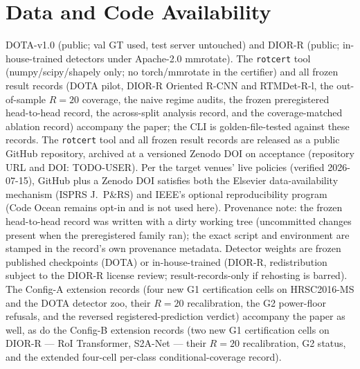 \documentclass[11pt]{article}
\begin{document}
\section*{Data and Code Availability}
DOTA-v1.0 (public; val GT used, test server untouched) and DIOR-R (public; in-house-trained detectors under
Apache-2.0 mmrotate). The \texttt{rotcert} tool (numpy/scipy/shapely only; no torch/mmrotate in the certifier)
and all frozen result records (DOTA pilot, DIOR-R Oriented R-CNN and RTMDet-R-l, the out-of-sample $R{=}20$
coverage, the naive regime audits, the frozen preregistered head-to-head record, the across-split analysis
record, and the coverage-matched ablation record) accompany the paper; the CLI is golden-file-tested against
these records. The \texttt{rotcert} tool and all frozen result records are released as a public GitHub
repository, archived at a versioned Zenodo DOI on acceptance (repository URL and DOI: TODO-USER).
Per the target venues' live policies (verified 2026-07-15), GitHub plus a Zenodo DOI satisfies both the
Elsevier data-availability mechanism (ISPRS J.\ P\&RS) and IEEE's optional reproducibility program
(Code Ocean remains opt-in and is not used here). Provenance note: the
frozen head-to-head record was written with a dirty working tree (uncommitted changes present when the
preregistered family ran); the exact script and environment are stamped in the record's own provenance
metadata. Detector weights are frozen published checkpoints (DOTA) or in-house-trained (DIOR-R, redistribution
subject to the DIOR-R license review; result-records-only if rehosting is barred). The Config-A extension
records (four new G1 certification cells on HRSC2016-MS and the DOTA detector zoo, their $R{=}20$
recalibration, the G2 power-floor refusals, and the reversed registered-prediction verdict) accompany the
paper as well, as do the Config-B extension records (two new G1 certification cells on DIOR-R --- RoI
Transformer, S2A-Net --- their $R{=}20$ recalibration, G2 status, and the extended four-cell per-class
conditional-coverage record).



\end{document}
